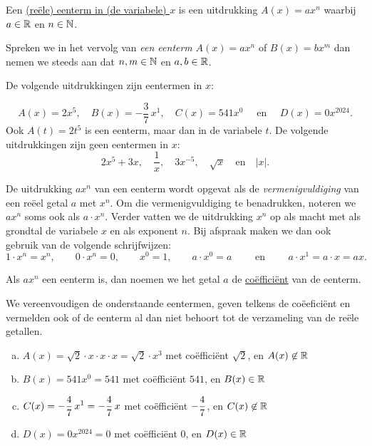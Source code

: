 \documentclass{ximera}
\begin{document}
\begin{definition} 
Een \underline{(re\"ele) eenterm in (de variabele) $x$} is een uitdrukking $A(x) = ax^n$ waarbij $a \in \mathbb{R}$ en $n \in \mathbb{N}$. 
\end{definition} 

Spreken we in het vervolg van {\em een eenterm} $A(x) = ax^n$ of $B(x) = bx^m$ dan nemen we steeds aan dat $n,m\in \mathbb{N}$ en $a,b\in \mathbb{R}$.

\begin{example} 
De volgende uitdrukkingen zijn eentermen in $x$:
  
\[
A(x) = 2x^5, \quad B(x) = -\frac{3}{7}\,x^1, \quad C(x) = 541x^0 \quad \text{ en } \quad D(x) = 0x^{2024}.
\]
Ook $A(t) = 2t^5$ is een eenterm, maar dan in de variabele $t$. De volgende uitdrukkingen zijn geen eentermen in $x$:
\[
2x^5+3x, \quad \frac{1}{x}, \quad 3x^{-5}, \quad \sqrt{x} \quad \text{en} \quad \left|x\right|.
\] 
\end{example} 

De uitdrukking $ax^n$ van een eenterm wordt opgevat als de {\em vermenigvuldiging} van een re\"eel getal $a$ met $x^n$. Om die vermenigvuldiging te benadrukken, noteren we $ax^n$ soms ook als $a \cdot x^n$. Verder vatten we de uitdrukking $x^n$ op als macht met als grondtal de variabele $x$ en als exponent $n$. Bij afspraak maken we dan ook gebruik van de volgende schrijfwijzen:
\[
1\cdot x^n = x^n, \qquad
0\cdot x^n = 0, \qquad  
x^0 = 1, \qquad 
a\cdot x^0 = a \qquad \text{ en } \qquad 
a\cdot x^1 = a \cdot x = ax.
\]

Als $ax^n$ een eenterm is, dan noemen we het getal $a$ de \underline{co\"effici\"ent} van de eenterm.

\begin{example} 
We vereenvoudigen de onderstaande eentermen, geven telkens de co\"eefici\"ent en vermelden ook of de eenterm al dan niet behoort tot de verzameling van de re\"ele getallen.
\begin{enumerate}[(a)]
\item
$A(x) = \sqrt{2}\cdot x \cdot x \cdot x = \sqrt{2}\cdot x^3$ met co\"effici\"ent $\sqrt{2}$, en $A(x) \not\in \mathbb{R}$
\item
$B(x) = 541x^0 = 541$ met co\"effici\"ent $541$, en $B(x) \in \mathbb{R}$ 
\item
$\displaystyle C(x) = -\frac{4}{7}\,x^1 = -\frac{4}{7}\,x$ met co\"effici\"ent $\displaystyle -\frac{4}{7}$, en $C(x) \not\in \mathbb{R}$
\item
$D(x) = 0 x^{2024} = 0$ met co\"effici\"ent $0$, en $D(x) \in \mathbb{R}$ 
\end{enumerate}
\end{example} 
\end{document}
